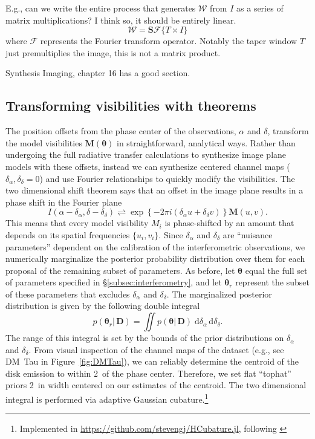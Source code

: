 \documentclass[modern]{aastex62}
\newcommand{\vm}{\boldsymbol{\mathcal{W}}} %
\begin{document}
E.g., can we write the entire process that generates $\vm$ from $I$ as a series of matrix multiplications? I think so, it should be entirely linear.
\begin{equation}
  \vm = \boldsymbol{S} \mathcal{F} \{ T \times I\}
\end{equation}
where $\mathcal{F}$ represents the Fourier transform operator. Notably the taper window $T$ just premultiplies the image, this is not a matrix product.

Synthesis Imaging, chapter 16 has a good section.

\subsection{Transforming visibilities with theorems}
The position offsets from the phase center of the observations, $\alpha$ and $\delta$, transform the model visibilities ${\bm M}({\bm \theta})$ in straightforward, analytical ways. Rather than undergoing the full radiative transfer calculations to synthesize image plane models with these offsets, instead we can synthesize centered channel maps ($\delta_\alpha, \delta_\delta=0$) and use Fourier relationships to quickly modify the visibilities.
The two dimensional shift theorem says that an offset in the image plane results in a phase shift in the Fourier plane \citep{bracewell00}
\begin{equation}
I(\alpha - \delta_\alpha, \delta - \delta_\delta) \rightleftharpoons \exp \left \{ -2 \pi i (\delta_\alpha u + \delta_\delta v) \right \} {\bm M}(u,v).
\end{equation}
This means that every model visibility $M_i$ is phase-shifted by an amount that depends on its spatial frequencies $\{u_i, v_i\}$.
Since $\delta_\alpha$ and $\delta_\delta$ are ``nuisance parameters'' dependent on the calibration of the interferometric observations, we numerically marginalize the posterior probability distribution over them for each proposal of the remaining subset of parameters.
As before, let ${\bm \theta}$ equal the full set of parameters specified in \S\ref{subsec:interferometry}, and let
${\bm \theta}_r$ represent the subset of these parameters that excludes $\delta_\alpha$ and $\delta_\delta$. The  marginalized posterior distribution is given by the following double integral
\begin{equation}
p({\bm \theta}_r |\,{\bm D}) = \iint p({\bm \theta} |\,{\bm D}) \;\mathrm{d}\delta_\alpha\,\mathrm{d}\delta_\delta.
\label{eqn:integral}
\end{equation}
The range of this integral is set by the bounds of the prior distributions on $\delta_\alpha$ and $\delta_\delta$. From visual inspection of the channel maps of the dataset (e.g., see DM~Tau in Figure~\ref{fig:DMTau}), we can reliably determine the centroid of the disk emission to within 2\arcsec\ of the phase center. Therefore, we set flat ``tophat'' priors 2\arcsec\ in width centered on our estimates of the centroid. The two dimensional integral is performed via adaptive Gaussian cubature.\footnote{Implemented in \url{https://github.com/stevengj/HCubature.jl}, following \citet{genz80}}
\end{document}
